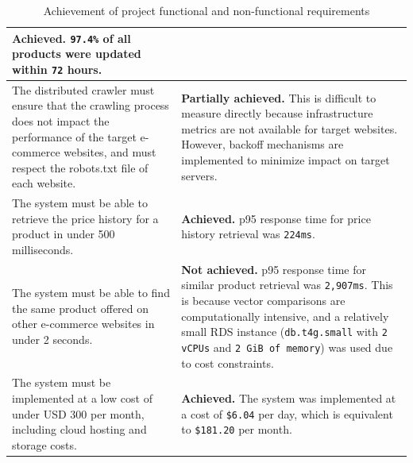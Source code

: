 \begin{table}[H]
\begin{tabularx}{\textwidth}{p{} p{}}
        \textbf{Achieved.} \texttt{97.4\%} of all products were updated within \texttt{72} hours. \\
        \midrule
        The distributed crawler must ensure that the crawling process does not impact the performance of the target e-commerce websites, and must respect the robots.txt file of each website. &
        \textbf{Partially achieved.} This is difficult to measure directly because infrastructure metrics are not available for target websites.
        However, backoff mechanisms are implemented to minimize impact on target servers. \\
        \midrule
        The system must be able to retrieve the price history for a product in under 500 milliseconds. &
        \textbf{Achieved.} p95 response time for price history retrieval was \texttt{224ms}. \\
        \midrule
        The system must be able to find the same product offered on other e-commerce websites in under 2 seconds. &
        \textbf{Not achieved.} p95 response time for similar product retrieval was \texttt{2,907ms}. This is because vector comparisons are computationally intensive, and a relatively small RDS instance (\texttt{db.t4g.small} with \texttt{2 vCPUs} and \texttt{2 GiB of memory}) was used due to cost constraints. \\
        \midrule
        The system must be implemented at a low cost of under USD 300 per month, including cloud hosting and storage costs. &
        \textbf{Achieved.} The system was implemented at a cost of \texttt{\$6.04} per day, which is equivalent to \texttt{\$181.20} per month.
         \\
        \bottomrule
    \end{tabularx}
    \caption{Achievement of project functional and non-functional requirements}
    \label{tab:requirements-achievement}
\end{table}